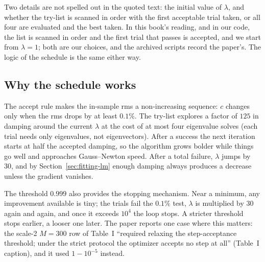 Two details are not spelled out in the quoted text: the initial value of $\lambda$, and whether the try-list is scanned in order with the first acceptable trial taken, or all four are evaluated and the best taken. In this book's reading, and in our code, the list is scanned in order and the first trial that passes is accepted, and we start from $\lambda=1$; both are our choices, and the archived scripts \cite{zenodo} record the paper's. The logic of the schedule is the same either way.

\subsection{Why the schedule works}

The accept rule makes the in-sample rms a non-increasing sequence: $c$ changes only when the rms drops by at least $0.1\%$. The try-list explores a factor of $125$ in damping around the current $\lambda$ at the cost of at most four eigenvalue solves (each trial needs only eigenvalues, not eigenvectors). After a success the next iteration starts at half the accepted damping, so the algorithm grows bolder while things go well and approaches Gauss--Newton speed. After a total failure, $\lambda$ jumps by 30, and by Section~\ref{sec:fitting-lm} enough damping always produces a decrease unless the gradient vanishes.

The threshold $0.999$ also provides the stopping mechanism. Near a minimum, any improvement available is tiny; the trials fail the $0.1\%$ test, $\lambda$ is multiplied by 30 again and again, and once it exceeds $10^4$ the loop stops. A stricter threshold stops earlier, a looser one later. The paper reports one case where this matters: the scale-2 $M=300$ row of Table~I ``required relaxing the step-acceptance threshold; under the strict protocol the optimizer accepts no step at all'' (Table~I caption), and it used $1-10^{-5}$ instead.

